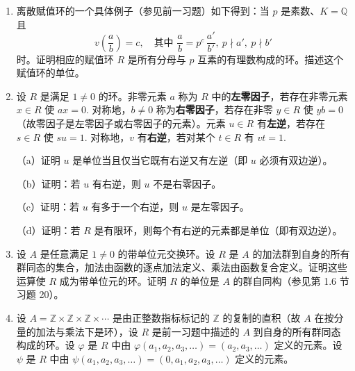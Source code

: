 \begin{enumerate}
（iii）对所有满足 \(x+y \neq 0\) 的 \(x, y \in K^\times\) 有 \(v(x+y) \geq \min\{v(x), v(y)\}\).

集合 \(R = \{x \in K^\times \mid v(x) \geq 0\} \cup \{0\}\) 称为 \(v\) 的\textbf{赋值环}。

（a）证明 \(R\) 是 \(K\) 的包含单位元的子环。（一般地，若存在某个域 \(K\) 和 \(K\) 上的某个离散赋值 \(v\) 使 \(R\) 是 \(v\) 的赋值环，则环 \(R\) 称为\textbf{离散赋值环}。）

（b）证明对每个非零元素 \(x \in K\)，\(x\) 或 \(x^{-1}\) 在 \(R\) 中。

（c）证明元素 \(x\) 是 \(R\) 的单位当且仅当 \(v(x) = 0\).

\item 离散赋值环的一个具体例子（参见前一习题）如下得到：当 \(p\) 是素数、\(K = \mathbb{Q}\) 且
\[
v\left(\frac{a}{b}\right) = c, \quad \text{其中 } \frac{a}{b} = p^c\,\frac{a'}{b'},\ p \nmid a',\ p \nmid b'
\]
时。证明相应的赋值环 \(R\) 是所有分母与 \(p\) 互素的有理数构成的环。描述这个赋值环的单位。

\item 设 \(R\) 是满足 \(1 \neq 0\) 的环。非零元素 \(a\) 称为 \(R\) 中的\textbf{左零因子}，若存在非零元素 \(x \in R\) 使 \(ax = 0\). 对称地，\(b \neq 0\) 称为\textbf{右零因子}，若存在非零 \(y \in R\) 使 \(yb = 0\)（故零因子是左零因子或右零因子的元素）。元素 \(u \in R\) 有\textbf{左逆}，若存在 \(s \in R\) 使 \(su = 1\). 对称地，\(v\) 有\textbf{右逆}，若对某个 \(t \in R\) 有 \(vt = 1\).

（a）证明 \(u\) 是单位当且仅当它既有右逆又有左逆（即 \(u\) 必须有双边逆）。

（b）证明：若 \(u\) 有右逆，则 \(u\) 不是右零因子。

（c）证明：若 \(u\) 有多于一个右逆，则 \(u\) 是左零因子。

（d）证明：若 \(R\) 是有限环，则每个有右逆的元素都是单位（即有双边逆）。

\item 设 \(A\) 是任意满足 \(1 \neq 0\) 的带单位元交换环。设 \(R\) 是 \(A\) 的加法群到自身的所有群同态的集合，加法由函数的逐点加法定义、乘法由函数复合定义。证明这些运算使 \(R\) 成为带单位元的环。证明 \(R\) 的单位是 \(A\) 的群自同构（参见第 1.6 节习题 20）。

\item 设 \(A = \mathbb{Z} \times \mathbb{Z} \times \mathbb{Z} \times \cdots\) 是由正整数指标标记的 \(\mathbb{Z}\) 的复制的直积（故 \(A\) 在按分量的加法与乘法下是环），设 \(R\) 是前一习题中描述的 \(A\) 到自身的所有群同态构成的环。设 \(\varphi\) 是 \(R\) 中由 \(\varphi(a_1, a_2, a_3, \ldots) = (a_2, a_3, \ldots)\) 定义的元素。设 \(\psi\) 是 \(R\) 中由 \(\psi(a_1, a_2, a_3, \ldots) = (0, a_1, a_2, a_3, \ldots)\) 定义的元素。


\end{enumerate}
